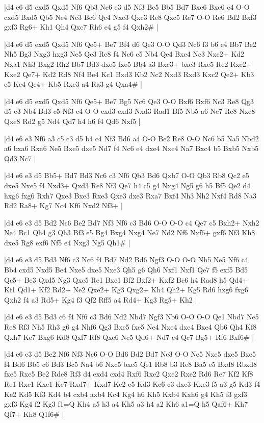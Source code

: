 \whitename{}
\blackname{}
\makegametitle
|d4 e6 d5 exd5 Qxd5 Nf6 Qb3 Nc6 e3 d5 Nf3 Bc5 Bb5 Bd7 Bxc6 Bxc6 c4 O-O cxd5 Bxd5 Qb5 Ne4 Nc3 Bc6 Qc4 Nxc3 Qxc3 Re8 Qxc5 Re7 O-O Re6 Bd2 Bxf3 gxf3 Rg6+ Kh1 Qh4 Qxc7 Rh6 e4 g5 f4 Qxh2\#  |

\whitename{}
\blackname{}
\makegametitle
|d4 e6 d5 exd5 Qxd5 Nf6 Qe5+ Be7 Bf4 d6 Qe3 O-O Qd3 Nc6 f3 b6 e4 Bb7 Be2 Nh5 Bg3 Nxg3 hxg3 Ne5 Qe3 Re8 f4 Nc6 e5 Nb4 Qe4 Bxe4 Nc3 Nxc2+ Kd2 Nxa1 Nh3 Bxg2 Rh2 Bb7 Bd3 dxe5 fxe5 Bb4 a3 Bxc3+ bxc3 Rxe5 Re2 Rxe2+ Kxe2 Qe7+ Kd2 Rd8 Nf4 Be4 Kc1 Bxd3 Kb2 Nc2 Nxd3 Rxd3 Kxc2 Qe2+ Kb3 c5 Kc4 Qe4+ Kb5 Rxc3 a4 Ra3 g4 Qxa4\#  |

\whitename{}
\blackname{}
\makegametitle
|d4 e6 d5 exd5 Qxd5 Nf6 Qe5+ Be7 Bg5 Nc6 Qe3 O-O Bxf6 Bxf6 Nc3 Re8 Qg3 d5 e3 Nb4 Bd3 c5 Nf3 c4 O-O cxd3 cxd3 Nxd3 Rad1 Bf5 Nb5 a6 Nc7 Rc8 Nxe8 Qxe8 Rd2 g5 Nd4 Qd7 h4 h6 f4 Qd6 Nxf5  |

\whitename{}
\blackname{}
\makegametitle
|d4 e6 e3 Nf6 a3 c5 c3 d5 b4 c4 Nf3 Bd6 a4 O-O Be2 Re8 O-O Nc6 b5 Na5 Nbd2 a6 bxa6 Rxa6 Ne5 Bxe5 dxe5 Nd7 f4 Nc6 e4 dxe4 Nxe4 Na7 Bxc4 b5 Bxb5 Nxb5 Qd3 Nc7  |

\whitename{}
\blackname{}
\makegametitle
|d4 e6 e3 d5 Bb5+ Bd7 Bd3 Nc6 c3 Nf6 Qb3 Bd6 Qxb7 O-O Qb3 Rb8 Qc2 e5 dxe5 Nxe5 f4 Nxd3+ Qxd3 Re8 Nf3 Qe7 h4 c5 g4 Nxg4 Ng5 g6 h5 Bf5 Qe2 d4 hxg6 fxg6 Rxh7 Qxe3 Bxe3 Rxe3 Qxe3 dxe3 Rxa7 Bxf4 Nh3 Nh2 Nxf4 Rd8 Na3 Rd2 Ra8+ Kg7 Nc4 Kf6 Nxd2 Nf3+  |

\whitename{}
\blackname{}
\makegametitle
|d4 e6 e3 d5 Bd2 Nc6 Be2 Bd7 Nf3 Nf6 c3 Bd6 O-O O-O c4 Qe7 c5 Bxh2+ Nxh2 Ne4 Bc1 Qh4 g3 Qh3 Bf3 e5 Bg4 Bxg4 Nxg4 Ne7 Nd2 Nf6 Nxf6+ gxf6 Nf3 Kh8 dxe5 Rg8 exf6 Nf5 e4 Nxg3 Ng5 Qh1\#  |

\whitename{}
\blackname{}
\makegametitle
|d4 e6 e3 d5 Bd3 Nf6 c3 Nc6 f4 Bd7 Nd2 Bd6 Ngf3 O-O O-O Nh5 Ne5 Nf6 c4 Bb4 cxd5 Nxd5 Be4 Nxe5 dxe5 Nxe3 Qh5 g6 Qh6 Nxf1 Nxf1 Qe7 f5 exf5 Bd5 Qc5+ Be3 Qxd5 Ng3 Qxe5 Re1 Bxe1 Bf2 Bxf2+ Kxf2 Bc6 h4 Rad8 h5 Qd4+ Kf1 Qd1+ Kf2 Rd2+ Ne2 Qxe2+ Kg3 Qxg2+ Kh4 Qh2+ Kg5 Rd6 hxg6 fxg6 Qxh2 f4 a3 Rd5+ Kg4 f3 Qf2 Rff5 a4 Rd4+ Kg3 Rg5+ Kh2  |

\whitename{}
\blackname{}
\makegametitle
|d4 e6 e3 d5 Bd3 c6 f4 Nf6 c3 Bd6 Nd2 Nbd7 Ngf3 Nb6 O-O O-O Qe1 Nbd7 Ne5 Re8 Rf3 Nh5 Rh3 g6 g4 Nhf6 Qg3 Bxe5 fxe5 Ne4 Nxe4 dxe4 Bxe4 Qb6 Qh4 Kf8 Qxh7 Ke7 Bxg6 Kd8 Qxf7 Rf8 Qxe6 Nc5 Qd6+ Nd7 e4 Qc7 Bg5+ Rf6 Bxf6\#  |

\whitename{}
\blackname{}
\makegametitle
|d4 e6 e3 d5 Be2 Nf6 Nf3 Nc6 O-O Bd6 Bd2 Bd7 Nc3 O-O Ne5 Nxe5 dxe5 Bxe5 f4 Bd6 Bb5 c6 Bd3 Bc5 Na4 b6 Nxc5 bxc5 Qe1 Rb8 b3 Re8 Ba5 e5 Bxd8 Rbxd8 fxe5 Rxe5 Be2 Rde8 Rf3 d4 exd4 cxd4 Rxf6 Rxe2 Qxe2 Rxe2 Rd6 Re7 Kf2 Kf8 Re1 Rxe1 Kxe1 Ke7 Rxd7+ Kxd7 Ke2 c5 Kd3 Kc6 c3 dxc3 Kxc3 f5 a3 g5 Kd3 f4 Ke2 Kd5 Kf3 Kd4 b4 cxb4 axb4 Kc4 Kg4 h6 Kh5 Kxb4 Kxh6 g4 Kh5 f3 gxf3 gxf3 Kg4 f2 Kg3 f1=Q Kh4 a5 h3 a4 Kh5 a3 h4 a2 Kh6 a1=Q h5 Qaf6+ Kh7 Qf7+ Kh8 Q1f6\#  |


